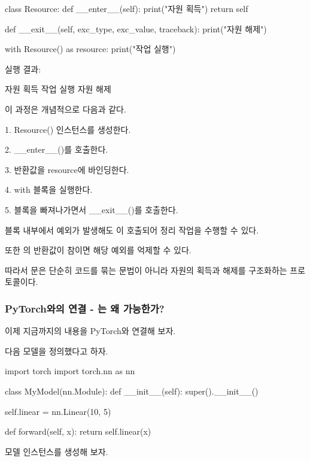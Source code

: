 \begin{dhkcode}
class Resource:
    def __enter__(self):
        print("자원 획득")
        return self

    def __exit__(self, exc_type, exc_value, traceback):
        print("자원 해제")

with Resource() as resource:
    print("작업 실행")
\end{dhkcode}

실행 결과:

\begin{dhkzsh}
자원 획득
작업 실행
자원 해제
\end{dhkzsh}

이 과정은 개념적으로 다음과 같다.

\begin{dhksmry}
    1. Resource() 인스턴스를 생성한다.

    2. __enter__()를 호출한다.

    3. 반환값을 resource에 바인딩한다.

    4. with 블록을 실행한다.

    5. 블록을 빠져나가면서 __exit__()를 호출한다.
\end{dhksmry}

 블록 내부에서 예외가 발생해도 이 호출되어 정리 작업을 수행할 수 있다.

또한 의 반환값이 참이면 해당 예외를 억제할 수 있다.

따라서 문은 단순히 코드를 묶는 문법이 아니라 자원의 획득과 해제를 구조화하는 프로토콜이다.

\subsubsection{PyTorch와의 연결 - 는 왜 가능한가?}

이제 지금까지의 내용을 PyTorch와 연결해 보자.

다음 모델을 정의했다고 하자.

\begin{dhkcode}
import torch
import torch.nn as nn


class MyModel(nn.Module):
    def __init__(self):
        super().__init__()

        self.linear = nn.Linear(10, 5)

    def forward(self, x):
        return self.linear(x)
\end{dhkcode}

모델 인스턴스를 생성해 보자.

